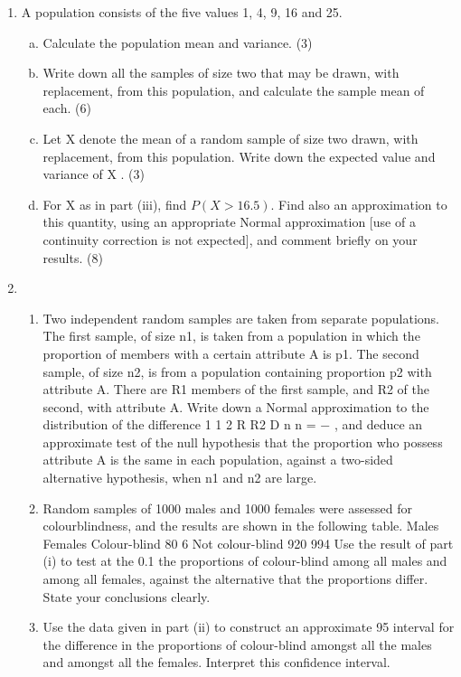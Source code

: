 
\begin{enumerate}
\item A population consists of the five values 1, 4, 9, 16 and 25.
\begin{enumerate}[(a)]
\item Calculate the population mean and variance. (3)
\item Write down all the samples of size two that may be drawn, with replacement,
from this population, and calculate the sample mean of each. (6)
\item Let X denote the mean of a random sample of size two drawn, with
replacement, from this population. Write down the expected value and
variance of X . (3)
\item For X as in part (iii), find $P( X > 16.5)$. Find also an approximation to this
quantity, using an appropriate Normal approximation [use of a continuity
correction is not expected], and comment briefly on your results. (8)
\end{enumerate}

\item 

\begin{enumerate}
\item Two independent random samples are taken from separate populations. The
first sample, of size n1, is taken from a population in which the proportion of
members with a certain attribute A is p1. The second sample, of size n2, is
from a population containing proportion p2 with attribute A. There are R1
members of the first sample, and R2 of the second, with attribute A.
Write down a Normal approximation to the distribution of the difference
1
1 2
R R2 D
n n = − , and deduce an approximate test of the null hypothesis that the
proportion who possess attribute A is the same in each population, against a
two-sided alternative hypothesis, when n1 and n2 are large.
\item Random samples of 1000 males and 1000 females were assessed for colourblindness,
and the results are shown in the following table.
Males Females
Colour-blind 80 6
Not colour-blind 920 994
Use the result of part (i) to test at the 0.1%
the proportions of colour-blind among all males and among all females, against
the alternative that the proportions differ. State your conclusions clearly.
\item Use the data given in part (ii) to construct an approximate 95%
interval for the difference in the proportions of colour-blind amongst all the
males and amongst all the females. Interpret this confidence interval.
\end{enumerate}


\end{enumerate}
